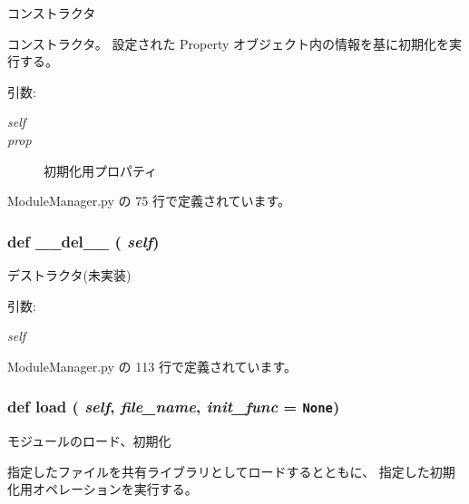 コンストラクタ 

コンストラクタ。 設定された Property オブジェクト内の情報を基に初期化を実行する。

\begin{Desc}
\item[引数:]
\begin{description}
\item[{\em self}]\item[{\em prop}]初期化用プロパティ \end{description}
\end{Desc}


 ModuleManager.py の 75 行で定義されています。
\subsubsection{\setlength{\rightskip}{0pt plus 5cm}def \_\-\_\-del\_\-\_\- ( {\em self})}\label{classsource__py_1_1_module_manager_1_1_module_manager_fa251912978c7d5ccf7e5a027a4d12ee}


デストラクタ(未実装) 

\begin{Desc}
\item[引数:]
\begin{description}
\item[{\em self}]\end{description}
\end{Desc}


 ModuleManager.py の 113 行で定義されています。
\subsubsection{\setlength{\rightskip}{0pt plus 5cm}def load ( {\em self},  {\em file\_\-name},  {\em init\_\-func} = {\tt None})}\label{classsource__py_1_1_module_manager_1_1_module_manager_34b4d3a01c4a6233a80fcbda3ba28c7f}


モジュールのロード、初期化 

指定したファイルを共有ライブラリとしてロードするとともに、 指定した初期化用オペレーションを実行する。

